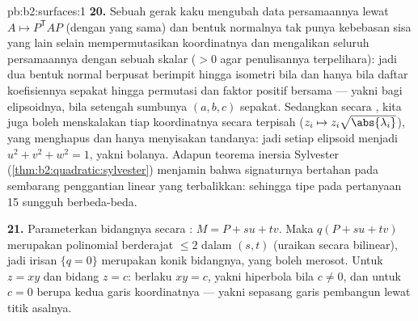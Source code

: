 \begin{solution}{pb:b2:surfaces:1}
\textbf{20.} Sebuah gerak kaku mengubah data persamaannya lewat
$A \mapsto P^{\mathsf T}\!AP$ (dengan  yang sama) dan
bentuk normalnya tak punya kebebasan sisa yang lain selain mempermutasikan
koordinatnya dan mengalikan seluruh persamaannya dengan sebuah skalar
($> 0$ agar penulisannya terpelihara): jadi dua bentuk normal berpusat
berimpit hingga isometri bila dan hanya bila daftar koefisiennya sepakat hingga
permutasi dan faktor positif bersama --- yakni bagi elipsoidnya,
bila setengah sumbunya $(a, b, c)$ sepakat. Sedangkan secara , kita juga boleh
menskalakan tiap koordinatnya secara terpisah ($z_i \mapsto z_i\sqrt{\abs
{\lambda_i}}$), yang menghapus  dan hanya menyisakan
tandanya: jadi setiap elipsoid menjadi $u^2 + v^2 + w^2 = 1$,
yakni bolanya. Adapun teorema inersia Sylvester
(\cref{thm:b2:quadratic:sylvester}) menjamin bahwa signaturnya
bertahan pada sembarang penggantian linear yang terbalikkan: sehingga tipe  pada
pertanyaan 15 sungguh berbeda-beda.

\textbf{21.} Parameterkan bidangnya secara : $M = P + su +
tv$. Maka $q(P + su + tv)$ merupakan polinomial berderajat $\leq 2$
dalam $(s, t)$ (uraikan  secara bilinear), jadi
irisan $\{q = 0\}$ merupakan konik bidangnya, yang boleh
merosot. Untuk $z = xy$ dan bidang $z = c$: berlaku $xy = c$, yakni
hiperbola bila $c \neq 0$, dan untuk $c = 0$ berupa kedua garis
koordinatnya --- yakni sepasang garis pembangun lewat titik asalnya.


\end{solution}
